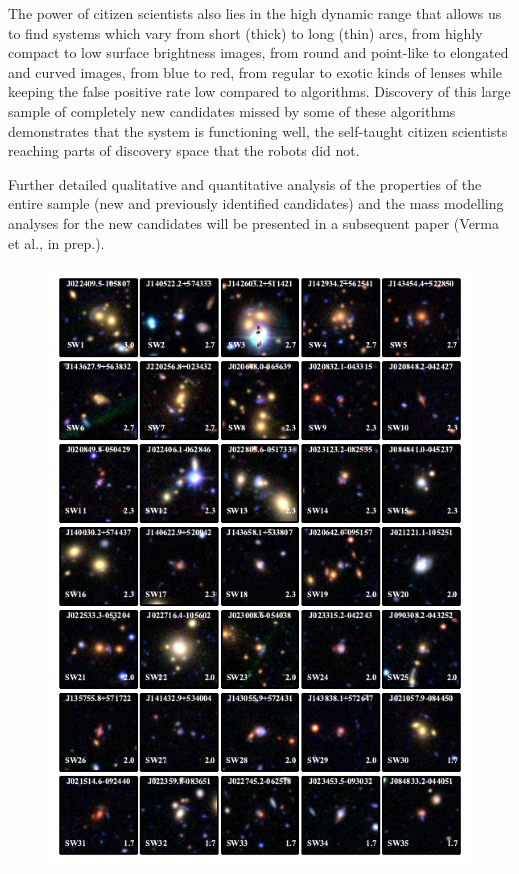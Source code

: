 \documentclass[useAMS,usenatbib,a4paper]{mn2e}
\begin{document}
The power of citizen scientists also lies in the high dynamic range that
allows us to find systems which vary from short (thick) to long (thin)
arcs, from highly compact to low surface brightness images, from round
and point-like to elongated and curved images, from blue to red, from
regular to exotic kinds of lenses while keeping the false positive rate
low compared to algorithms. Discovery of this large sample of completely
new candidates missed by some of these algorithms demonstrates that the
\sw system is functioning well, the self-taught citizen scientists
reaching parts of discovery space that the robots did not.

Further detailed qualitative and quantitative analysis of the properties
of the entire \sw sample (new and previously identified candidates) and
the mass modelling analyses for the new candidates will be presented in
a subsequent \sw paper (Verma et al., in prep.).

\begin{figure}
\begin{center}
\includegraphics[scale=1.9]{lenscandfin.pdf}
\end{center}
\end{figure}
\end{document}
